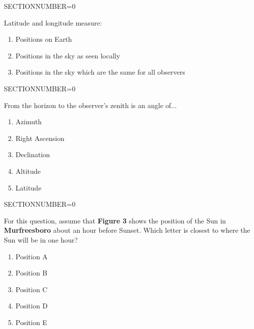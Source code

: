 \documentclass[11pt]{article}
\begin{document}
\begin{enumerate}
\begin{minipage}{\textwidth}
\begin{minipage}{\textwidth}
\end{minipage}
SECTIONNUMBER=0
\end{minipage}
\vskip 0.20in

\begin{minipage}{\textwidth}
\begin{minipage}{\textwidth}
\item Latitude and longitude measure:
\begin{enumerate} 
\setlength{\itemsep}{1pt} 
\setlength{\parskip}{0pt} 
\setlength{\parsep}{0pt}
\setlength{\multicolsep}{1pt} 
\item Positions on Earth
\item Positions in the sky as seen locally
\item Positions in the sky which are the same for all observers
\end{enumerate} 
\end{minipage}
SECTIONNUMBER=0
\end{minipage}
\vskip 0.20in

\begin{minipage}{\textwidth}
\begin{minipage}{\textwidth}
\item From the horizon to the observer's zenith is an angle of...
\begin{multicols}{3}
\begin{enumerate} 
\setlength{\itemsep}{1pt} 
\setlength{\parskip}{0pt} 
\setlength{\parsep}{0pt}
\setlength{\multicolsep}{1pt} 
\item Azimuth
\item Right Ascension
\item Declination
\item Altitude
\item Latitude
\end{enumerate} 
\vfill 
\end{multicols}

\end{minipage}
SECTIONNUMBER=0
\end{minipage}
\vskip 0.20in

\begin{minipage}{\textwidth}
\begin{minipage}{\textwidth}
\item For this question, assume that {\bf Figure 3} shows the position of the Sun in {\bf Murfreesboro} about an hour before Sunset.   Which letter is closest to where the Sun will be in one hour?
\begin{multicols}{3}
\begin{enumerate} 
\setlength{\itemsep}{1pt} 
\setlength{\parskip}{0pt} 
\setlength{\parsep}{0pt}
\setlength{\multicolsep}{1pt} 
\item Position A
\item Position B
\item Position C
\item Position D
\item Position E
\end{enumerate} 
\vfill 
\end{multicols}


\end{minipage}
\end{minipage}
\end{enumerate}
\end{document}
